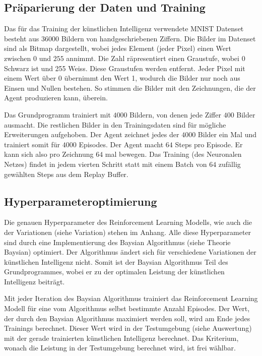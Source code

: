 \subsection{Präparierung der Daten und Training}
Das für das Training der künstlichen Intelligenz verwendete MNIST Datenset
besteht aus $36000$ Bildern von handgeschriebenen Ziffern. Die Bilder im
Datenset sind als Bitmap dargestellt, wobei jedes Element (jeder Pixel) einen
Wert zwischen $0$ und $255$ annimmt. Die Zahl räpresentiert einen Graustufe,
wobei 0 Schwarz ist und 255 Weiss. Diese Graustufen werden entfernt. Jeder Pixel
mit einem Wert über 0 übernimmt den Wert 1, wodurch die Bilder nur noch aus
Einsen und Nullen bestehen. So stimmen die Bilder mit den Zeichnungen, die der
Agent produzieren kann, überein.

Das Grundprogramm trainiert mit $4000$ Bildern, von denen jede Ziffer $400$
Bilder ausmacht. Die restlichen Bilder in den Trainingsdaten sind für mögliche
Erweiterungen aufgehoben. Der Agent zeichnet jedes der $4000$ Bilder ein Mal und
trainiert somit für $4000$ Episodes. Der Agent macht $64$ Steps pro Episode.
Er kann sich also pro Zeichnung $64$ mal bewegen. Das Training (des Neuronalen
Netzes) findet in jedem vierten Schritt statt mit einem Batch von $64$ zufällig
gewählten Steps aus dem Replay Buffer.

\subsection{Hyperparameteroptimierung}
\label{chap:Hyperparameter Optimierung}
Die genauen Hyperparameter des Reinforcement Learning Modells, wie auch die der     
Variationen (siehe Variation) stehen im Anhang. Alle diese Hyperparameter sind    %
durch eine Implementierung des Baysian Algorithmus \cite{fernando_bayesian_2022}
(siehe Theorie Baysian) optimiert. Der Algorithmus ändert sich für
verschiedene Variationen der künstlichen Intelligenz nicht. Somit ist der
Baysian Algorithmus Teil des Grundprogrammes, wobei er zu der optimalen Leistung
der künstlichen Intelligenz beiträgt. 

Mit jeder Iteration des Baysian Algorithmus trainiert das Reinforcement Learning
Modell für eine vom Algorithmus selbst bestimmte Anzahl Episodes. Der Wert, der
durch den Baysian Algorithmus maximiert werden soll, wird am Ende jedes
Trainings berechnet. Dieser Wert wird in der Testumgebung (siehe Auswertung) mit
der gerade trainierten künstlichen    %
Intelligenz berechnet. Das Kriterium, wonach die Leistung in der Testumgebung
berechnet wird, ist frei wählbar.


